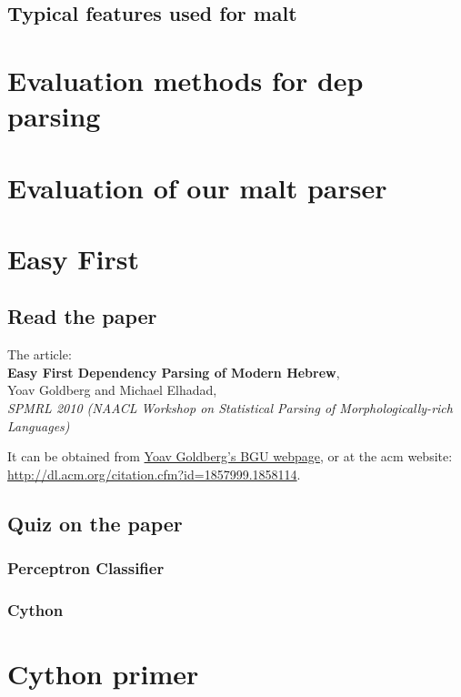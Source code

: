 \documentclass[11pt]{article}
\begin{document}
\subsection{Typical features used for malt}
\label{sec-4-2}
\section{Evaluation methods for dep parsing}
\label{sec-5}
\section{Evaluation of our malt parser}
\label{sec-6}
\section{Easy First}
\label{sec-7}
\subsection{Read the paper}
\label{sec-7-1}


The article: \\
\textbf{Easy First Dependency Parsing of Modern Hebrew}, \\
   Yoav Goldberg and Michael Elhadad, \\
   \emph{SPMRL 2010 (NAACL Workshop on Statistical Parsing of    Morphologically-rich Languages)}


It can be obtained from \href{http://www.cs.bgu.ac.il/~yoavg/publications/naacl2010dep.pdf}{Yoav Goldberg's BGU webpage}, or at the acm
website: 
\href{http://dl.acm.org/citation.cfm?id=1857999.1858114}{http://dl.acm.org/citation.cfm?id=1857999.1858114}.


   
\subsection{Quiz on the paper}
\label{sec-7-2}
\subsubsection{Perceptron Classifier}
\label{sec-7-2-1}
\subsubsection{Cython}
\label{sec-7-2-2}

    
\section{Cython primer}
\label{sec-8}
\end{document}
